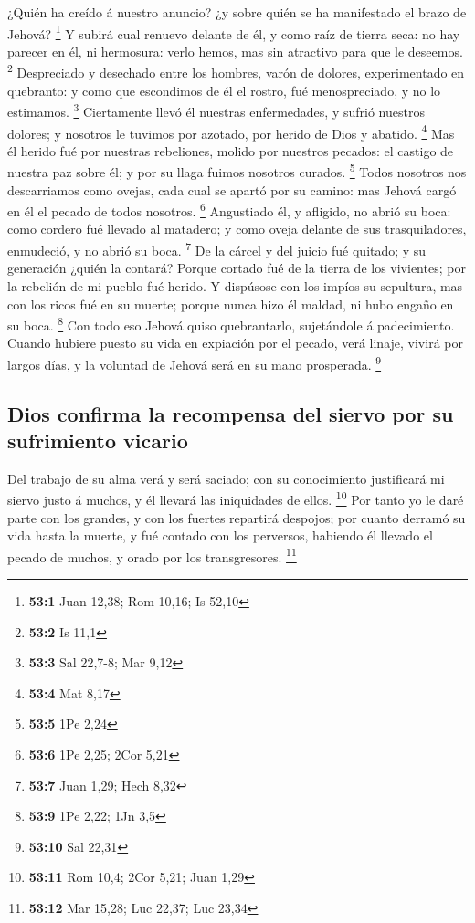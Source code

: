  ¿Quién ha creído á nuestro anuncio? ¿y sobre quién se ha
manifestado el brazo de Jehová? \footnote{\textbf{53:1} Juan 12,38; Rom
  10,16; Is 52,10}  Y subirá cual renuevo delante de él, y
como raíz de tierra seca: no hay parecer en él, ni hermosura: verlo
hemos, mas sin atractivo para que le deseemos. \footnote{\textbf{53:2}
  Is 11,1}  Despreciado y desechado entre los hombres, varón
de dolores, experimentado en quebranto: y como que escondimos de él el
rostro, fué menospreciado, y no lo estimamos. \footnote{\textbf{53:3}
  Sal 22,7-8; Mar 9,12}  Ciertamente llevó él nuestras
enfermedades, y sufrió nuestros dolores; y nosotros le tuvimos por
azotado, por herido de Dios y abatido. \footnote{\textbf{53:4} Mat 8,17}
 Mas él herido fué por nuestras rebeliones, molido por
nuestros pecados: el castigo de nuestra paz sobre él; y por su llaga
fuimos nosotros curados. \footnote{\textbf{53:5} 1Pe 2,24} 
Todos nosotros nos descarriamos como ovejas, cada cual se apartó por su
camino: mas Jehová cargó en él el pecado de todos nosotros. \footnote{\textbf{53:6}
  1Pe 2,25; 2Cor 5,21}  Angustiado él, y afligido, no abrió
su boca: como cordero fué llevado al matadero; y como oveja delante de
sus trasquiladores, enmudeció, y no abrió su boca. \footnote{\textbf{53:7}
  Juan 1,29; Hech 8,32}  De la cárcel y del juicio fué
quitado; y su generación ¿quién la contará? Porque cortado fué de la
tierra de los vivientes; por la rebelión de mi pueblo fué herido.
 Y dispúsose con los impíos su sepultura, mas con los ricos
fué en su muerte; porque nunca hizo él maldad, ni hubo engaño en su
boca. \footnote{\textbf{53:9} 1Pe 2,22; 1Jn 3,5}  Con todo
eso Jehová quiso quebrantarlo, sujetándole á padecimiento. Cuando
hubiere puesto su vida en expiación por el pecado, verá linaje, vivirá
por largos días, y la voluntad de Jehová será en su mano prosperada.
\footnote{\textbf{53:10} Sal 22,31}

\hypertarget{dios-confirma-la-recompensa-del-siervo-por-su-sufrimiento-vicario}{%
\subsection{Dios confirma la recompensa del siervo por su sufrimiento
vicario}\label{dios-confirma-la-recompensa-del-siervo-por-su-sufrimiento-vicario}}

 Del trabajo de su alma verá y será saciado; con su
conocimiento justificará mi siervo justo á muchos, y él llevará las
iniquidades de ellos. \footnote{\textbf{53:11} Rom 10,4; 2Cor 5,21; Juan
  1,29}  Por tanto yo le daré parte con los grandes, y con
los fuertes repartirá despojos; por cuanto derramó su vida hasta la
muerte, y fué contado con los perversos, habiendo él llevado el pecado
de muchos, y orado por los transgresores. \footnote{\textbf{53:12} Mar
  15,28; Luc 22,37; Luc 23,34}

